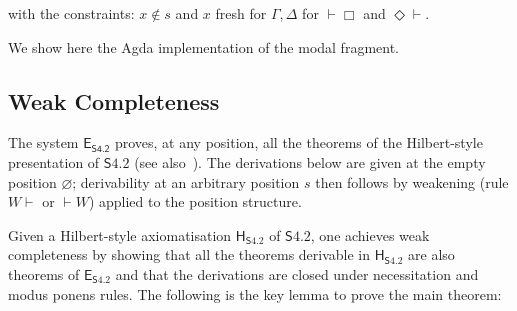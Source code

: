 \documentclass{article}
\newcommand{\logic}{\mathsf{S4.2}}
\newcommand{\calculus}{\mathsf{E}_{\logic}}
\newcommand{\eseq}{\mathsf{E}_{{\textsf{S4.2}}}}
\newcommand{\agda}{\textsf{Agda}}
\newcommand{\hilbertlogic}[1]{\mathsf{H}_{#1}}
\theoremstyle{definition}
\begin{document}
with the constraints:  $x \notin s$ and $x$ fresh for $\Gamma, \Delta$ for $\vdash \Box$  and $\Diamond \vdash$.


We show here the \agda{} implementation of the modal fragment.





\subsection{Weak Completeness}
The system $\eseq$ proves, at any position, all the theorems of the Hilbert-style presentation of $\logic$ (see also~\cite{Martini2024:S42NaturalDeduction}). The derivations below are given at the empty position $\varnothing$; derivability at an arbitrary position $s$ then follows by weakening (rule $W\vdash$ or $\vdash W$) applied to the position structure.




Given a Hilbert-style axiomatisation $\hilbertlogic{\logic}$ of $\logic$, one achieves weak completeness by showing that all the theorems derivable in $\hilbertlogic{\logic}$ are also theorems of $\calculus$ and that the derivations are closed under necessitation and modus ponens rules.
The following is the key lemma to prove the main theorem:
\end{document}
